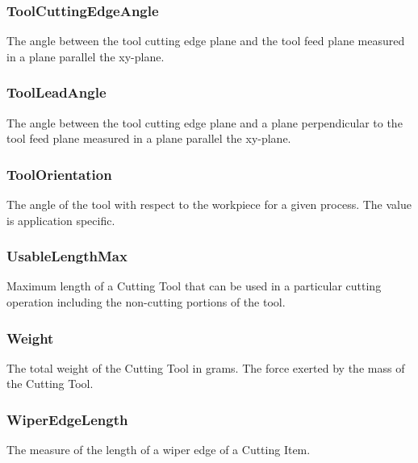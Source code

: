 \subsubsection{ToolCuttingEdgeAngle}
\label{sec:ToolCuttingEdgeAngle}



The angle between the tool cutting edge plane and the tool feed plane measured in a plane parallel the xy-plane.



\subsubsection{ToolLeadAngle}
\label{sec:ToolLeadAngle}



The angle between the tool cutting edge plane and a plane perpendicular to the tool feed plane measured in a plane parallel the xy-plane.



\subsubsection{ToolOrientation}
\label{sec:ToolOrientation}



The angle of the tool with respect to the workpiece for a given process. The value is application specific.



\subsubsection{UsableLengthMax}
\label{sec:UsableLengthMax}



Maximum length of a Cutting Tool that can be used in a particular cutting operation including the non-cutting portions of the tool.



\subsubsection{Weight}
\label{sec:Weight}



The total weight of the Cutting Tool in grams. The force exerted by the mass of the Cutting Tool.



\subsubsection{WiperEdgeLength}
\label{sec:WiperEdgeLength}



The measure of the length of a wiper edge of a Cutting Item.


